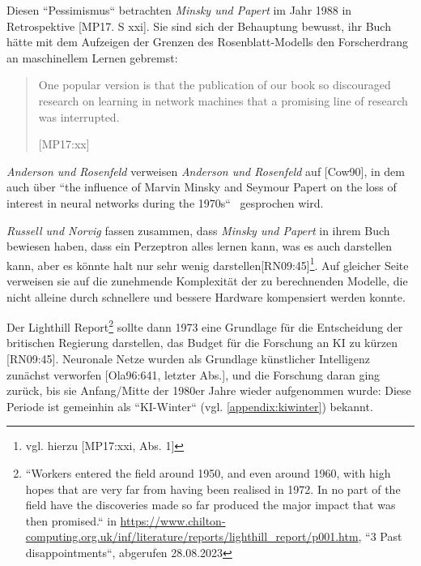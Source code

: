 \noindent
Diesen ``Pessimismus`` betrachten \textit{Minsky und Papert} im Jahr 1988 in Retrospektive [MP17. S xxi]. Sie sind sich der Behauptung bewusst, ihr Buch hätte mit dem Aufzeigen der Grenzen des Rosenblatt-Modells den Forscherdrang an maschinellem Lernen gebremst:

\blockquote[{[MP17:xx]}]{
One popular version is  that the publication of our book so discouraged research on learning in network machines that a promising line of research was interrupted.
}

\noindent
\textit{Anderson und Rosenfeld} verweisen \textit{Anderson und Rosenfeld} auf [Cow90], in dem auch über ``the influence of Marvin Minsky and Seymour Papert on the loss of interest in neural networks during the 1970s``~\cite[X]{AR98} gesprochen wird.

\textit{Russell und Norvig} fassen zusammen, dass \textit{Minsky und Papert} in ihrem Buch bewiesen haben, dass ein Perzeptron alles lernen kann, was es auch darstellen kann, aber es könnte halt nur sehr wenig darstellen[RN09:45]\footnote{
    vgl. hierzu [MP17:xxi, Abs. 1]
}. Auf gleicher Seite verweisen sie auf die zunehmende Komplexität der zu berechnenden Modelle, die nicht alleine durch schnellere und bessere Hardware kompensiert werden konnte.

Der Lighthill Report\footnote{
    ``Workers entered the field around 1950, and even around 1960, with high hopes that are very far from having been realised in 1972. In no part of the field have the discoveries made so far produced the major impact that was then promised.`` in \url{https://www.chilton-computing.org.uk/inf/literature/reports/lighthill\_report/p001.htm}, ``3 Past disappointments``, abgerufen 28.08.2023
} sollte dann 1973 eine Grundlage für die Entscheidung der britischen Regierung darstellen, das Budget für die Forschung an KI zu kürzen [RN09:45]. Neuronale Netze wurden als Grundlage künstlicher Intelligenz zunächst verworfen [Ola96:641, letzter Abs.], und die Forschung daran ging zurück, bis sie Anfang/Mitte der 1980er Jahre wieder aufgenommen wurde: Diese Periode ist gemeinhin als ``KI-Winter`` (vgl. \ref{appendix:kiwinter}) bekannt.

